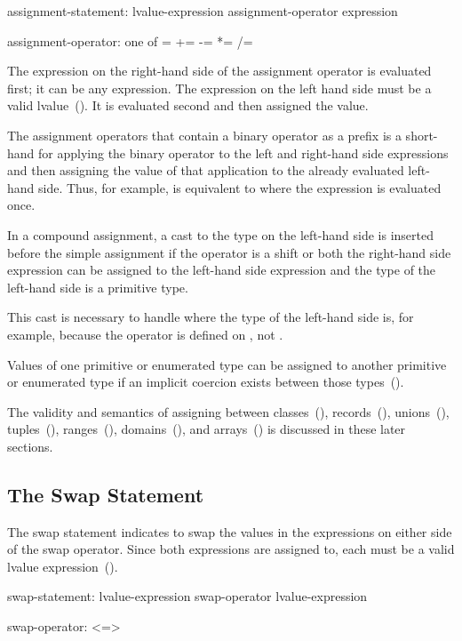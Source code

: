 \begin{syntax}
assignment-statement:
  lvalue-expression assignment-operator expression

assignment-operator: one of
   = += -= *= /= %
\end{syntax}

The expression on the right-hand side of the assignment operator is
evaluated first; it can be any expression.  The expression on the left
hand side must be a valid lvalue~().  It is evaluated
second and then assigned the value.

The assignment operators that contain a binary operator as a prefix is
a short-hand for applying the binary operator to the left and
right-hand side expressions and then assigning the value of that
application to the already evaluated left-hand side.  Thus, for
example,  is equivalent to  where the
expression  is evaluated once.

In a compound assignment, a cast to the type on the left-hand side is
inserted before the simple assignment if the operator is a shift or
both the right-hand side expression can be assigned to the left-hand
side expression and the type of the left-hand side is a primitive
type.

\begin{rationale}
This cast is necessary to handle \chpl{+=} where the type of the
left-hand side is, for example,  because the \chpl{+}
operator is defined on , not .
\end{rationale}

Values of one primitive or enumerated type can be assigned to another
primitive or enumerated type if an implicit coercion exists between
those types~().

The validity and semantics of assigning between
classes~(), records~(),
unions~(), tuples~(),
ranges~(),
domains~(), and arrays~()
is discussed in these later sections.

\subsection{The Swap Statement}
\label{The_Swap_Statement}
The swap statement indicates to swap the values in the expressions
on either side of the swap operator.  Since both expressions are assigned
to, each must be a valid lvalue expression~().
\begin{syntax}
swap-statement:
  lvalue-expression swap-operator lvalue-expression

swap-operator:
  <=>
\end{syntax}

